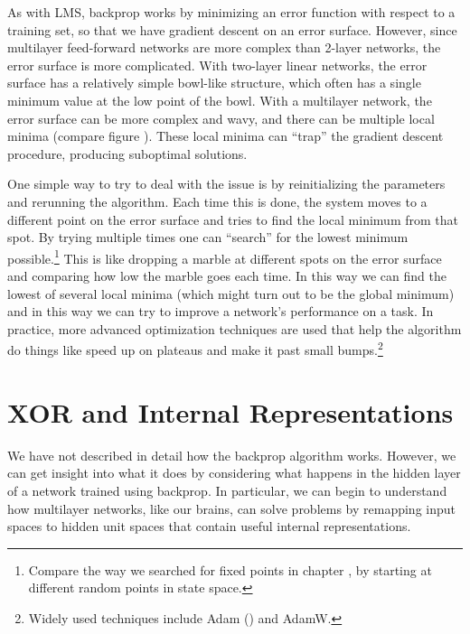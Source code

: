 As with LMS, backprop works by minimizing an error function with respect to a training set, so that we have gradient descent on an error surface. However, since multilayer feed-forward networks are more complex than 2-layer networks, the error surface is more complicated. With two-layer linear networks, the error surface has a relatively simple bowl-like structure, which often has a single minimum value at the low point of the bowl. With a multilayer network, the error surface can be more complex and wavy, and there can be multiple local minima (compare figure ). These local minima can ``trap'' the gradient descent procedure, producing suboptimal solutions.

One simple way to try to deal with the issue is by reinitializing the parameters and rerunning the algorithm. Each time this is done, the system moves to a different point on the error surface and tries to find the local minimum from that spot. By trying multiple times one can ``search'' for the lowest minimum possible.\footnote{Compare the way we searched for fixed points in chapter , by starting at different random points in state space.}  This is like dropping a marble at different spots on the error surface and comparing how low the marble goes each time. In this way we can find the lowest of several local minima (which might turn out to be the global minimum) and in this way we can try to improve a network's performance on a task. In practice, more advanced optimization techniques are used that help the algorithm do things like speed up on plateaus and make it past small bumps.\footnote{Widely used techniques include Adam () and AdamW.}

\section{XOR and Internal Representations}\label{sect_xor_remap}

We have not described in detail how the backprop algorithm works. However, we can get insight into what it does by considering what happens in the hidden layer of a network trained using backprop. In particular, we can begin to understand how multilayer networks, like our brains, can solve problems by remapping input spaces to hidden unit spaces that contain useful internal representations.

